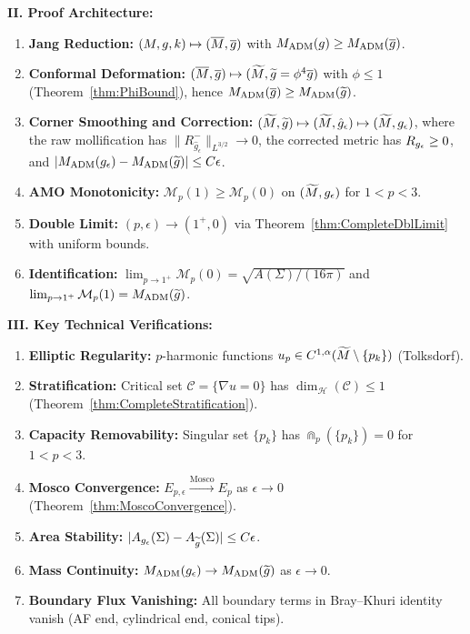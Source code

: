 \begin{theorem}
\textbf{II. Proof Architecture:}
\begin{enumerate}
    \item \textbf{Jang Reduction:} $(M, g, k) \mapsto (\overline{M}, \overline{g})$ with $M_{\mathrm{ADM}}(g) \ge M_{\mathrm{ADM}}(\overline{g})$.
    \item \textbf{Conformal Deformation:} $(\overline{M}, \overline{g}) \mapsto (\widetilde{M}, \widetilde{g} = \phi^4 \overline{g})$ with $\phi \le 1$ (Theorem~\ref{thm:PhiBound}), hence $M_{\mathrm{ADM}}(\overline{g}) \ge M_{\mathrm{ADM}}(\widetilde{g})$.
    \item \textbf{Corner Smoothing and Correction:} $(\widetilde{M}, \widetilde{g}) \mapsto (\widetilde{M}, \hat{g}_\epsilon) \mapsto (\widetilde{M},g_{\epsilon})$, where the raw mollification has $\|R^-_{\hat{g}_\epsilon}\|_{L^{3/2}}\to0$, the corrected metric has $R_{g_{\epsilon}} \ge 0$, and $|M_{\mathrm{ADM}}(g_{\epsilon}) - M_{\mathrm{ADM}}(\widetilde{g})| \le C\epsilon$.
    \item \textbf{AMO Monotonicity:} $\mathcal{M}_p(1) \ge \mathcal{M}_p(0)$ on $(\widetilde{M}, g_{\epsilon})$ for $1 < p < 3$.
    \item \textbf{Double Limit:} $(p, \epsilon) \to (1^+, 0)$ via Theorem~\ref{thm:CompleteDblLimit} with uniform bounds.
    \item \textbf{Identification:} $\lim_{p \to 1^+} \mathcal{M}_p(0) = \sqrt{A(\Sigma)/(16\pi)}$ and $\lim_{p \to 1^+} \mathcal{M}_p(1) = M_{\mathrm{ADM}}(\widetilde{g})$.
\end{enumerate}

\textbf{III. Key Technical Verifications:}
\begin{enumerate}
    \item[(V1)] \textbf{Elliptic Regularity:} $p$-harmonic functions $u_p \in C^{1,\alpha}(\widetilde{M} \setminus \{p_k\})$ (Tolksdorf).
    \item[(V2)] \textbf{Stratification:} Critical set $\mathcal{C} = \{\nabla u = 0\}$ has $\dim_{\mathcal{H}}(\mathcal{C}) \le 1$ (Theorem~\ref{thm:CompleteStratification}).
    \item[(V3)] \textbf{Capacity Removability:} Singular set $\{p_k\}$ has $\Cap_p(\{p_k\}) = 0$ for $1 < p < 3$.
    \item[(V4)] \textbf{Mosco Convergence:} $E_{p,\epsilon} \xrightarrow{\text{Mosco}} E_p$ as $\epsilon \to 0$ (Theorem~\ref{thm:MoscoConvergence}).
    \item[(V5)] \textbf{Area Stability:} $|A_{g_{\epsilon}}(\Sigma) - A_{\widetilde{g}}(\Sigma)| \le C\epsilon$.
    \item[(V6)] \textbf{Mass Continuity:} $M_{\mathrm{ADM}}(g_{\epsilon}) \to M_{\mathrm{ADM}}(\widetilde{g})$ as $\epsilon \to 0$.
    \item[(V7)] \textbf{Boundary Flux Vanishing:} All boundary terms in Bray--Khuri identity vanish (AF end, cylindrical end, conical tips).
\end{enumerate}


\end{theorem}
